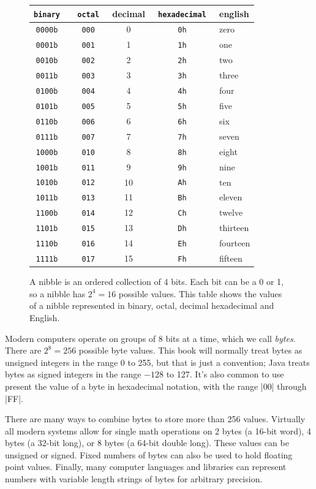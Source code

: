 \begin{figure}
\begin{tabular}{>{\tt}c>{\tt}cc>{\tt}cl}
\textrm{binary} & \textrm{octal} & decimal & \textrm{hexadecimal} & english \\
\hline
0000b & 000 & 0 & 0h & zero \\
0001b & 001 & 1 & 1h & one \\
0010b & 002 & 2 & 2h & two \\
0011b & 003 & 3 & 3h & three \\
0100b & 004 & 4 & 4h & four \\
0101b & 005 & 5 & 5h & five \\
0110b & 006 & 6 & 6h & six \\
0111b & 007 & 7 & 7h & seven \\
1000b & 010 & 8 & 8h & eight \\
1001b & 011 & 9 & 9h & nine \\
1010b & 012 & 10& Ah & ten \\
1011b & 013 & 11& Bh & eleven \\
1100b & 014 & 12& Ch & twelve \\
1101b & 015 & 13& Dh & thirteen \\
1110b & 016 & 14& Eh & fourteen \\
1111b & 017 & 15& Fh & fifteen \\
\hline
\end{tabular}
\caption{A nibble is an ordered collection of 4 bits. Each bit can be
  a 0 or 1, so a nibble has $2^4=16$ possible values. This table shows
  the values of a nibble represented in binary, octal, decimal hexadecimal and English.}\label{nibble}
\end{figure}

Modern computers operate on groups of 8 bits at a time, which we call
\emph{bytes}. There are $2^8=256$ possible byte values. This book will
normally treat bytes as unsigned integers in the range 0 to 255, but
that is just a convention; Java treats bytes as signed integers in the
range $-128$ to 127. It's also common to use present the value of a
byte in hexadecimal notation, with the range |00| through |FF|. 

There are many ways to combine bytes to store more than 256
values. Virtually all modern systems allow for single math operations on 2
bytes (a 16-bit word), 4 bytes (a 32-bit long), or 8 bytes (a 64-bit
double long). These values can be unsigned or signed. Fixed numbers of
bytes can also be used to hold floating point values. Finally, many
computer languages and libraries can represent numbers with variable
length strings of bytes for arbitrary precision.

